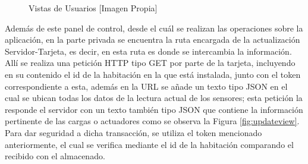 \begin{figure}[H]
	\centering
	\caption{Vistas de Usuarios [Imagen Propia]}
	\label{fig:views}
\end{figure}

Además de este panel de control, desde el cuál se realizan las operaciones sobre la aplicación, en la parte privada se encuentra la ruta encargada de la actualización Servidor-Tarjeta, es decir, en esta ruta es donde se intercambia la información. Allí se realiza una petición HTTP tipo GET por parte de la tarjeta, incluyendo en su contenido el id de la habitación en la que está instalada, junto con el token correspondiente a esta, además en la URL se añade un texto tipo JSON en el cual se ubican todas los datos de la lectura actual de los sensores; esta petición la responde el servidor con un texto también tipo JSON que contiene la información pertinente de las cargas o actuadores como se observa la Figura \ref{fig:updateview}. Para dar seguridad a dicha transacción, se utiliza el token mencionado anteriormente, el cual se verifica mediante el id de la habitación comparando el recibido con el almacenado.\\

